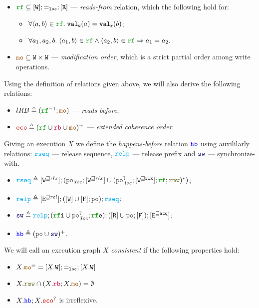 \documentclass[12pt]{article}
\begin{document}
\begin{definition}
\begin{itemize}
    \item $\lRF \subseteq [\lW];=_{\lLOC};[\lR]$ --- \emph{reads-from} relation,
    which the following hold for:
    \begin{itemize}
      \item $\forall{\tup{a, b}} \in \lRF. \; \lVALW(a) = \lVALR(b)$;
      \item $\forall{a_1, a_2, b}. \;
        \tup{a_1, b} \in \lRF \wedge \tup{a_2, b} \in \lRF \Rightarrow a_1 = a_2.$
    \end{itemize}
    
    \item $\lMO \subseteq \lW \times \lW$ --- \emph{modification order},
    which is a strict partial order among write operations.

  \end{itemize}

  Using the definition of relations given above,
  we will also derive the following relations:
  \begin{itemize}
    \item $lRB \defeq (\lRF^{-1};\lMO)$ --- \emph{reads before};
    \item $\lECO \defeq (\lRF \cup \lRB \cup \lMO)^+$ --- \emph{extended coherence order}.
  \end{itemize}

\end{definition}


\begin{definition}
  Giving an execution $X$ we define the \emph{happens-before} relation $\lHB$
  using auxililarly relations: 
  $\lRSEQ$ --- release sequence,
  $\lRELP$ --- release prefix and
  $\lSW$ --- synchronize-with.
  \begin{itemize}
  \item $\lRSEQ \defeq [\lWsqeq{rlx}];(\lmakeLoc{\lPO};[\lWsqeq{rlx}] \cup 
    (\lmakeLoc{\lPO^?};[\lWsqeq{\rlx}];\lRF;\lRMW)^*)$;
  \item $\lRELP \defeq [\lEsqeq{rel}];([\lW] \cup [\lF];\lPO);\lRSEQ$;
  \item $\lSW \defeq \lRELP; (\lRFI \cup \lmakeLoc{\lPO^?};\lRFE); ([\lR] \cup \lPO;[\lF]);[\lEsqeq{\acq}]$;
  \item $\lHB \defeq (\lPO \cup \lSW)^+$.
  \end{itemize}
\end{definition}

\begin{definition}
  We will call an execution graph $X$ \emph{consistent} if the following properties hold:
  \begin{itemize}
    \item $X.\lMO^= = [X.\lW];=_{\lLOC};[X.\lW]$
    \item $X.\lRMW \cap (X.\lRB;X.\lMO) = \emptyset$
    \item $X.\lHB;X.\lECO^?$ is irreflexive.
  \end{itemize}
\end{definition}
\end{document}

